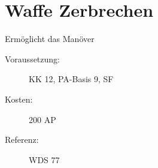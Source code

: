 \section{Waffe Zerbrechen}
\label{sf.waffe_zerbrechen}
Ermöglicht das Manöver 
\begin{description}
    \item[Voraussetzung:]
        KK 12, PA-Basis 9, SF 
    \item [Kosten:]
        200 AP
    \item [Referenz:]
        WDS 77
\end{description}
